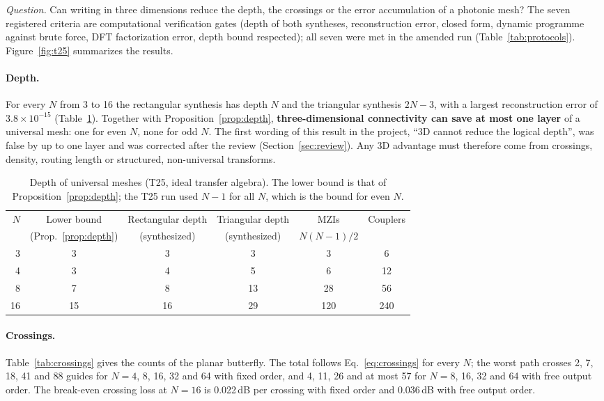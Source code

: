 \documentclass[11pt,a4paper]{article}
\newcommand{\dB}{\,dB\xspace}
\begin{document}
\emph{Question.} Can writing in three dimensions reduce the depth, the crossings or the error accumulation of a photonic mesh? The seven registered criteria are computational verification gates (depth of both syntheses, reconstruction error, closed form, dynamic programme against brute force, DFT factorization error, depth bound respected); all seven were met in the amended run (Table~\ref{tab:protocols}). Figure~\ref{fig:t25} summarizes the results.

\paragraph{Depth.} For every $N$ from 3 to 16 the rectangular synthesis has depth $N$ and the triangular synthesis $2N-3$, with a largest reconstruction error of $3.8\times10^{-15}$ (Table~\ref{tab:depth}). Together with Proposition~\ref{prop:depth}, \textbf{three-dimensional connectivity can save at most one layer} of a universal mesh: one for even $N$, none for odd $N$. The first wording of this result in the project, ``3D cannot reduce the logical depth'', was false by up to one layer and was corrected after the review (Section~\ref{sec:review}). Any 3D advantage must therefore come from crossings, density, routing length or structured, non-universal transforms.

\begin{table}[t]
\centering\small
\caption{Depth of universal meshes (T25, ideal transfer algebra). The lower bound is that of Proposition~\ref{prop:depth}; the T25 run used $N-1$ for all $N$, which is the bound for even $N$.}
\label{tab:depth}
\begin{tabular}{@{}rccccc@{}}
\toprule
$N$ & Lower bound & Rectangular depth & Triangular depth & MZIs & Couplers \\
 & (Prop.~\ref{prop:depth}) & (synthesized) & (synthesized) & $N(N-1)/2$ & \\
\midrule
3 & 3 & 3 & 3 & 3 & 6 \\
4 & 3 & 4 & 5 & 6 & 12 \\
8 & 7 & 8 & 13 & 28 & 56 \\
16 & 15 & 16 & 29 & 120 & 240 \\
\bottomrule
\end{tabular}
\end{table}

\paragraph{Crossings.} Table~\ref{tab:crossings} gives the counts of the planar butterfly. The total follows Eq.~\eqref{eq:crossings} for every $N$; the worst path crosses 2, 7, 18, 41 and 88 guides for $N=4$, 8, 16, 32 and 64 with fixed order, and 4, 11, 26 and at most 57 for $N=8$, 16, 32 and 64 with free output order. The break-even crossing loss at $N=16$ is 0.022\dB per crossing with fixed order and 0.036\dB with free output order.
\end{document}

